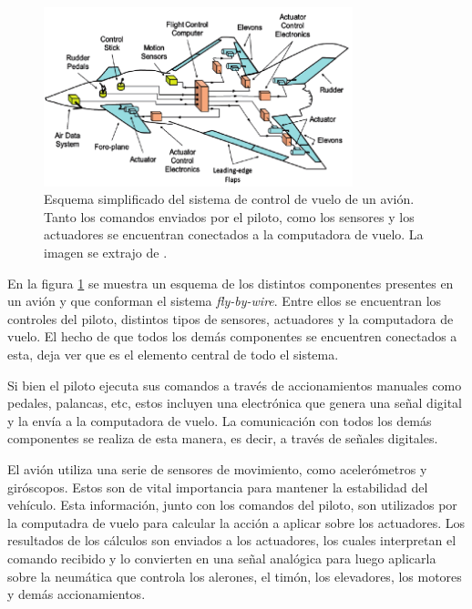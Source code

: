 \begin{figure}[H]
    \centering
    \includegraphics[width=0.8\textwidth]{img/avion_FBW.png}
    \caption{Esquema simplificado del sistema de control de vuelo de un avión. Tanto los comandos enviados por el piloto, como los sensores y los actuadores se encuentran conectados a la computadora de vuelo. La imagen se extrajo de \cite{collinson2023introduction}.}
    \label{fig:avion_FBW}
\end{figure}


En la figura \ref{fig:avion_FBW} se muestra un esquema de los distintos componentes presentes en un avión y que conforman el sistema \textit{fly-by-wire}. Entre ellos se encuentran los controles del piloto, distintos tipos de sensores, actuadores y la computadora de vuelo. El hecho de que todos los demás componentes se encuentren conectados a esta, deja ver que es el elemento central de todo el sistema. 

Si bien el piloto ejecuta sus comandos a través de accionamientos manuales como pedales, palancas, etc, estos incluyen una electrónica que genera una señal digital y la envía a la computadora de vuelo. La comunicación con todos los demás componentes se realiza de esta manera, es decir, a través de señales digitales.

El avión utiliza una serie de sensores de movimiento, como acelerómetros y giróscopos. Estos son de vital importancia para mantener la estabilidad del vehículo. Esta información, junto con los comandos del piloto, son utilizados por la computadra de vuelo para calcular la acción a aplicar sobre los actuadores. Los resultados de los cálculos son enviados a los actuadores, los cuales interpretan el comando recibido y lo convierten en una señal analógica para luego aplicarla sobre la neumática que controla los alerones, el timón, los elevadores, los motores y demás accionamientos. %


